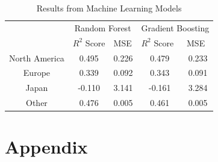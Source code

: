 \documentclass[english]{article}
\begin{document}
\begin{table}
    \begin{center}
        \begin{minipage}[c]{0.5\textwidth}
            \centering
            \begin{tabular}[b]{c|ccl|ccl|}
                \cline{2-7}
                                                    & \multicolumn{3}{c|}{Random Forest}                            & \multicolumn{3}{c|}{Gradient Boosting}                        \\ \cline{2-7} 
                \multicolumn{1}{l|}{}               & \multicolumn{1}{l|}{$R^2$ Score} & \multicolumn{2}{l|}{MSE}   & \multicolumn{1}{l|}{$R^2$ Score} & \multicolumn{2}{l|}{MSE}   \\ \hline
                \multicolumn{1}{|c|}{North America} & \multicolumn{1}{c|}{0.495}       & \multicolumn{2}{c|}{0.226} & \multicolumn{1}{c|}{0.479}       & \multicolumn{2}{c|}{0.233} \\ \hline
                \multicolumn{1}{|c|}{Europe}        & \multicolumn{1}{c|}{0.339}       & \multicolumn{2}{c|}{0.092} & \multicolumn{1}{c|}{0.343}       & \multicolumn{2}{c|}{0.091} \\ \hline
                \multicolumn{1}{|c|}{Japan}         & \multicolumn{1}{c|}{-0.110}      & \multicolumn{2}{c|}{3.141} & \multicolumn{1}{c|}{-0.161}      & \multicolumn{2}{c|}{3.284} \\ \hline
                \multicolumn{1}{|c|}{Other}         & \multicolumn{1}{c|}{0.476}       & \multicolumn{2}{c|}{0.005} & \multicolumn{1}{c|}{0.461}       & \multicolumn{2}{c|}{0.005} \\ \hline
            \end{tabular}
            \label{tbl:regressors}
        \end{minipage}
    \end{center}

    \caption{Results from Machine Learning Models}
\end{table}

\newpage

\section*{Appendix}
\end{document}
